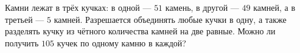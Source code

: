 Камни лежат в трёх кучках: в одной --- $51$ камень, в другой --- $49$ камней, а в третьей --- $5$ камней. Разрешается объединять любые кучки в одну, а также разделять кучку из чётного количества камней на две равные. Можно ли получить $105$ кучек по одному камню в каждой?